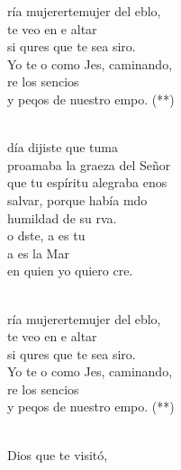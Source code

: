 \documentclass[12pt]{article}
\begin{document}
\begin{multicols*}{2}
\begin{cancion}%
	\begin{chorus}%
	ría mujerertemujer del eblo,\\
	 te veo en e altar\\
	si qures que te sea siro.\\
	Yo te o como Jes, caminando, \\
	re los sencios \\
	y peqos de nuestro empo. (**) \\
	\end{chorus}%
	\jump\\
	 día dijiste que tuma\\
	proamaba la graeza del Señor\\
	que tu espíritu alegraba enos\\
	 salvar, porque había mdo\\
	humildad de su rva.  \\
	o dste, a es tu \\
	a es la Mar \\
	en quien yo quiero cre.\\\jump\\
	\begin{chorus}%
	ría mujerertemujer del eblo,\\
	 te veo en e altar\\
	si qures que te sea siro.\\
	Yo te o como Jes, caminando, \\
	re los sencios \\
	y peqos de nuestro empo. (**) \\
	\end{chorus}%
	\jump\\
	 Dios que te visitó,\\

\end{cancion}
\end{multicols*}
\end{document}

